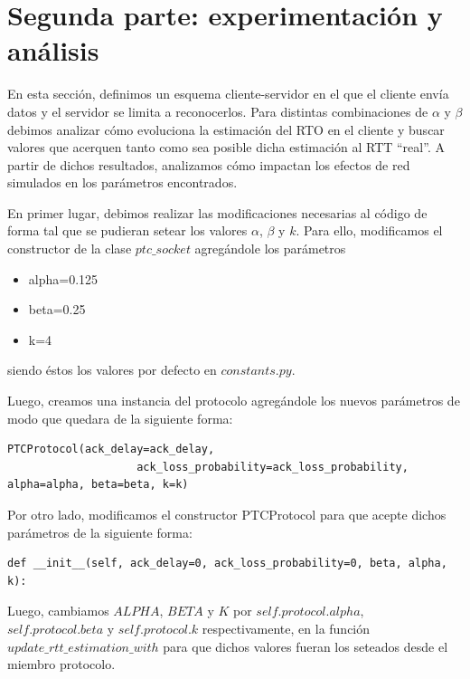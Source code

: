 \documentclass[10pt, a4paper]{article}
\begin{document}
\newpage
\section{Segunda parte: experimentación y análisis}

En esta sección, definimos un esquema cliente-servidor en el que el cliente envía datos y el servidor se limita a reconocerlos. Para distintas combinaciones de $\alpha$ y $\beta$ debimos analizar cómo evoluciona la estimación del RTO en el cliente y buscar valores que acerquen tanto como sea posible dicha estimación al RTT ``real''. A partir de dichos resultados, analizamos cómo impactan los efectos de red simulados en los parámetros encontrados.


En primer lugar, debimos realizar las modificaciones necesarias al código de forma tal que se pudieran setear los valores $\alpha$, $\beta$ y $k$. 
Para ello, modificamos el constructor de la clase $ptc\_socket$ agregándole los parámetros 
\begin{itemize}
\item alpha=0.125
\item beta=0.25
\item k=4
\end{itemize}
siendo éstos los valores por defecto en $constants.py$.

Luego, creamos una instancia del protocolo agregándole los nuevos parámetros de modo que quedara de la siguiente forma:
\begin{verbatim}
PTCProtocol(ack_delay=ack_delay, 
					ack_loss_probability=ack_loss_probability, alpha=alpha, beta=beta, k=k)
\end{verbatim}

Por otro lado, modificamos el constructor PTCProtocol para que acepte dichos parámetros de la siguiente forma:
\begin{verbatim}
def __init__(self, ack_delay=0, ack_loss_probability=0, beta, alpha, k):
\end{verbatim}

Luego, cambiamos $ALPHA$, $BETA$ y $K$ por $self.protocol.alpha$, $self.protocol.beta$ y $self.protocol.k$ respectivamente, en la función $update\_rtt\_estimation\_with$ para que dichos valores fueran los seteados desde el miembro protocolo.
\end{document}
